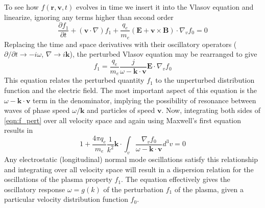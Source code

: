 To see how $f(\mathbf{r}, \mathbf{v}, t)$ evolves in time we insert it into the Vlasov equation and linearize, ignoring any terms higher than second order
\begin{equation}
\frac{\partial f_1}{\partial t} + (\mathbf{v}\cdot \nabla)f_1 +\frac{q_e}{m_e}(\mathbf{E} + \mathbf{v}\times \mathbf{B})\cdot\nabla_vf_0=0
\end{equation}
Replacing the time and space derivatives with their oscillatory operators ($\partial/\partial t \rightarrow -i\omega$, $\nabla \rightarrow i\mathbf{k}$), the perturbed Vlasov equation may be rearranged to give
\begin{equation}
f_1=\frac{q_e}{m_e}\frac{j}{\omega-\mathbf{k\cdot v}}\mathbf{E}\cdot\nabla_vf_0
\label{eqn:f_pert}
\end{equation}
This equation relates the perturbed quantity $f_1$ to the unperturbed distribution function and the electric field. The most important aspect of this equation is the $\omega-\mathbf{k\cdot v}$ term in the denominator, implying the possibility of resonance between waves of phase speed $\omega/\mathbf{k}$ and particles of speed $\mathbf{v}$. Now, integrating both sides of \ref{eqn:f_pert} over all velocity space and again using Maxwell's first equation results in
\begin{equation}
1+\frac{4\pi q_e}{m_e}\frac{1}{k^2}\mathbf{k}\cdot\int_v\frac{\nabla_v f_0}{\omega-\mathbf{k\cdot v}}d^3v=0
\label{eqn:dispersion}
\end{equation}
Any electrostatic (longitudinal) normal mode oscillations satisfy this relationship and integrating over all velocity space will result in a dispersion relation for the oscillations of the plasma property $f_1$. The equation effectively gives the oscillatory response $\omega = g(k)$ of the perturbation $f_1$ of the plasma, given a particular velocity distribution function $f_0$. 


